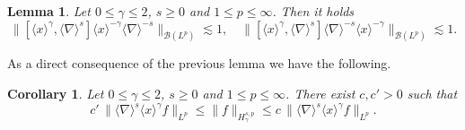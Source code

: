 \documentclass[12pt]{article}
\theoremstyle{plain}
\newtheorem{lemma}[theo]{Lemma}
\newtheorem{cor}[theo]{Corollary}
\begin{document}
\begin{lemma}
\label{lemma: [x^gamma, grad^s]}
    Let $0\leq \gamma\leq 2$,  $s\geq 0$ and $1\leq p \leq \infty$. Then it holds 
    \begin{equation*}
        \|[\langle x \rangle^\gamma , \langle \nabla \rangle^s]\langle x \rangle^{-\gamma} \langle \nabla \rangle^{-s} \|_{\mathcal{B}(L^p)}\lesssim 1, \quad \|[\langle x \rangle^\gamma , \langle \nabla \rangle^s]\langle \nabla \rangle^{-s}   \langle x \rangle^{-\gamma} \|_{\mathcal{B}(L^p)}\lesssim 1 .
    \end{equation*}
\end{lemma}

As a direct consequence of the previous lemma we have the following.
 
\begin{cor}\label{cor:weighted-sobolev}
 Let $0\leq \gamma\leq 2$,  $s\geq 0$ and $1\leq p \leq \infty$. There exist $c, c'>0$ such that 
 \begin{equation*}
    c'\,  \| \langle \nabla \rangle^s \langle x \rangle^\gamma f \|_{L^p} \leq   \| f \|_{H_\gamma^{s,p}} \leq c\,  \| \langle \nabla \rangle^s \langle x \rangle^\gamma f \|_{L^p} . 
 \end{equation*}
\end{cor}
\end{document}
